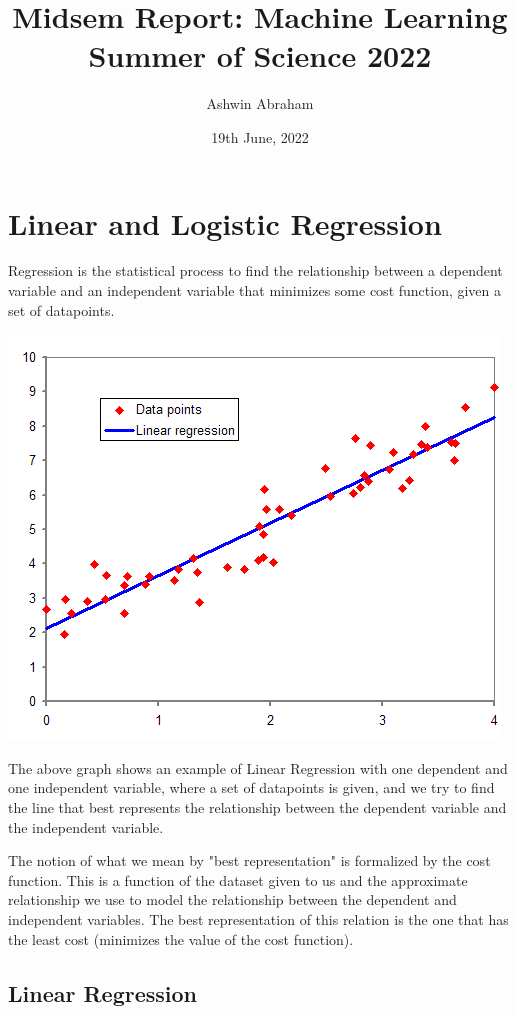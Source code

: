 \documentclass[12 pt]{report}
\title{
    {\textbf{Midsem Report: Machine Learning}}\\
    {\large Summer of Science 2022}\\
}
\author{Ashwin Abraham}
\date{19th June, 2022}
\begin{document}
    \maketitle
    \tableofcontents

    \chapter{Linear and Logistic Regression}
    Regression is the statistical process to find the relationship between a dependent variable and an independent variable that minimizes some 
    cost function, given a set of datapoints.


    \includegraphics[scale = 0.7]{Normdist_regression}


    The above graph shows an example of Linear Regression with one dependent and one independent variable, where a set of datapoints is given, and we try to find the line that best represents the
    relationship between the dependent variable and the independent variable.

    The notion of what we mean by "best representation" is formalized by the cost function. This is a function of the dataset given to us and the 
    approximate relationship we use to model the relationship between the dependent and independent variables. The best representation of this 
    relation is the one that has the least cost (minimizes the value of the cost function).

    \section{Linear Regression}
\end{document}
